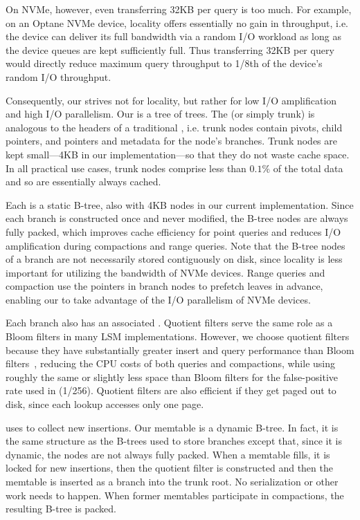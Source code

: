 On NVMe, however, even transferring 32KB per query is too much.  For
example, on an Optane NVMe device, locality offers essentially no gain
in throughput, i.e. the device can deliver its full bandwidth via a
random I/O workload as long as the device queues are kept sufficiently
full.  Thus transferring 32KB per query would directly reduce maximum
query throughput to 1/8th of the device's random I/O throughput.

Consequently, our \datastruct strives not for locality, but rather for
low I/O amplification and high I/O parallelism.  Our \datastruct is a
tree of trees. The  (or simply trunk) is analogous to
the headers of a traditional \bet, i.e. trunk nodes contain pivots,
child pointers, and pointers and metadata for the node's branches.
Trunk nodes are kept small---4KB in our implementation---so that they
do not waste cache space. In all practical use cases, trunk nodes
comprise less than $0.1\%$ of the total data and so are essentially
always cached.

Each  is a static B-tree, also with 4KB nodes in our
current implementation. Since each branch is constructed once and
never modified, the B-tree nodes are always fully packed, which
improves cache efficiency for point queries and reduces I/O
amplification during compactions and range queries.  Note that the
B-tree nodes of a branch are not necessarily stored contiguously on
disk, since locality is less important for utilizing the bandwidth of
NVMe devices. Range queries and compaction use the pointers in branch
nodes to prefetch leaves
in advance, enabling our \datastruct to take advantage of the I/O
parallelism of NVMe devices.

Each branch also has an associated . Quotient filters
serve the same role as a Bloom filters in many LSM implementations.  However,
we choose quotient filters because they have substantially greater insert and
query performance than Bloom
filters~\cite{DBLP:journals/pvldb/BenderFJKKMMSSZ12}, reducing the CPU costs of
both queries and compactions, while using roughly the same or slightly less
space than Bloom filters for the false-positive rate used in \sysname (1/256).
Quotient filters are also efficient if they get paged out to disk, since each
lookup accesses only one page.

\sysname uses  to collect new insertions.
Our memtable is a dynamic B-tree.  In fact, it is the same structure
as the B-trees used to store branches except that, since it is
dynamic, the nodes are not always fully packed.  When a memtable
fills, it is locked for new insertions, then the quotient filter is
constructed and then the memtable is inserted as a branch into the
trunk root.  No serialization or other work needs to happen.  When
former memtables participate in compactions, the resulting B-tree is
packed.

